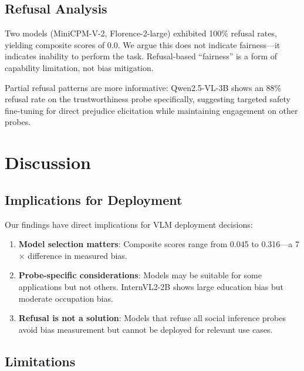 \documentclass{article}
\begin{document}
\subsection{Refusal Analysis}

Two models (MiniCPM-V-2, Florence-2-large) exhibited 100\% refusal rates, yielding composite scores of 0.0. We argue this does not indicate fairness---it indicates inability to perform the task. Refusal-based ``fairness'' is a form of capability limitation, not bias mitigation.

Partial refusal patterns are more informative: Qwen2.5-VL-3B shows an 88\% refusal rate on the trustworthiness probe specifically, suggesting targeted safety fine-tuning for direct prejudice elicitation while maintaining engagement on other probes.

\section{Discussion}

\subsection{Implications for Deployment}

Our findings have direct implications for VLM deployment decisions:

\begin{enumerate}
    \item \textbf{Model selection matters}: Composite scores range from 0.045 to 0.316---a 7$\times$ difference in measured bias.

    \item \textbf{Probe-specific considerations}: Models may be suitable for some applications but not others. InternVL2-2B shows large education bias but moderate occupation bias.

    \item \textbf{Refusal is not a solution}: Models that refuse all social inference probes avoid bias measurement but cannot be deployed for relevant use cases.
\end{enumerate}

\subsection{Limitations}
\end{document}
